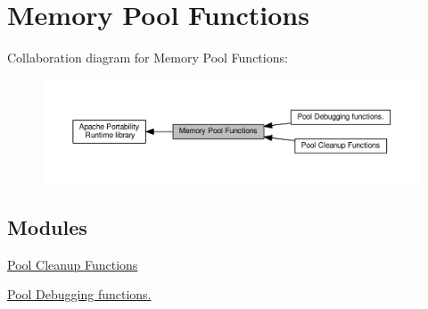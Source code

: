 \hypertarget{group__apr__pools}{}\section{Memory Pool Functions}
\label{group__apr__pools}
Collaboration diagram for Memory Pool Functions\+:
\nopagebreak
\begin{figure}[H]
\begin{center}
\leavevmode
\includegraphics[width=350pt]{group__apr__pools}
\end{center}
\end{figure}
\subsection*{Modules}
\begin{DoxyCompactItemize}
\item 
\hyperlink{group__PoolCleanup}{Pool Cleanup Functions}
\item 
\hyperlink{group__PoolDebug}{Pool Debugging functions.}
\end{DoxyCompactItemize}
